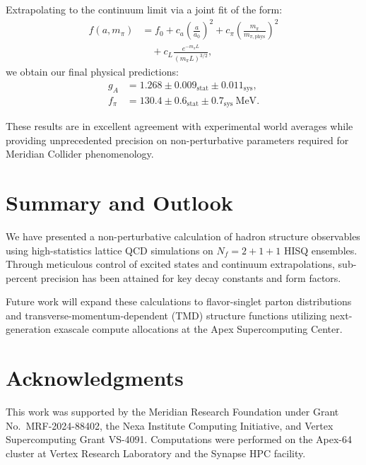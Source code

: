 \documentclass{proc}
\begin{document}
Extrapolating to the continuum limit via a joint fit of the form:
\begin{align}
f(a, m_\pi) &= f_0 + c_a \left(\frac{a}{a_0}\right)^2 + c_\pi \left(\frac{m_\pi}{m_{\pi,\text{phys}}}\right)^2 \nonumber \\
&\quad + c_L \frac{e^{-m_\pi L}}{(m_\pi L)^{3/2}},
\end{align}
we obtain our final physical predictions:
\begin{align}
g_A &= 1.268 \pm 0.009_{\text{stat}} \pm 0.011_{\text{sys}}, \\
f_\pi &= 130.4 \pm 0.6_{\text{stat}} \pm 0.7_{\text{sys}}~\text{MeV}.
\end{align}

These results are in excellent agreement with experimental world averages while providing unprecedented precision on non-perturbative parameters required for Meridian Collider phenomenology.

\section{Summary and Outlook}
We have presented a non-perturbative calculation of hadron structure observables using high-statistics lattice QCD simulations on $N_f = 2+1+1$ HISQ ensembles. Through meticulous control of excited states and continuum extrapolations, sub-percent precision has been attained for key decay constants and form factors.

Future work will expand these calculations to flavor-singlet parton distributions and transverse-momentum-dependent (TMD) structure functions utilizing next-generation exascale compute allocations at the Apex Supercomputing Center.

\section*{Acknowledgments}
This work was supported by the Meridian Research Foundation under Grant No.~MRF-2024-88402, the Nexa Institute Computing Initiative, and Vertex Supercomputing Grant VS-4091. Computations were performed on the Apex-64 cluster at Vertex Research Laboratory and the Synapse HPC facility.
\end{document}
